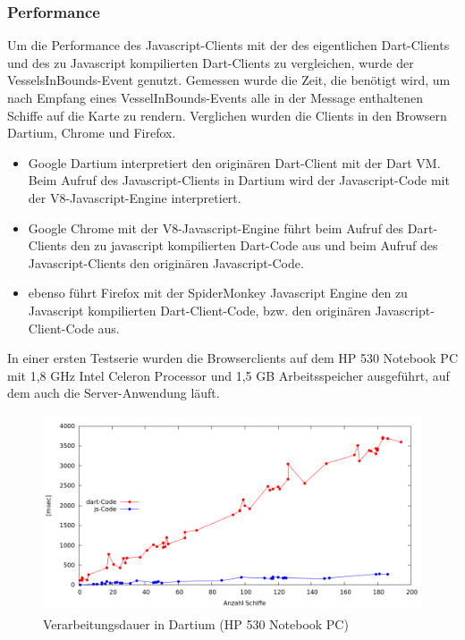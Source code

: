\subsubsection{Performance}
Um die Performance des Javascript-Clients mit der des eigentlichen Dart-Clients und des zu Javascript kompilierten Dart-Clients zu vergleichen, wurde der VesselsInBounds-Event genutzt. Gemessen wurde die Zeit, die benötigt wird, um nach Empfang eines VesselInBounds-Events alle in der Message enthaltenen Schiffe auf die Karte zu rendern. Verglichen wurden die Clients in den Browsern Dartium, Chrome und Firefox.
\begin{itemize}
\item Google Dartium interpretiert den originären Dart-Client mit der Dart VM. Beim Aufruf des Javascript-Clients in Dartium wird der Javascript-Code mit der V8-Javascript-Engine interpretiert.
\item Google Chrome  mit der V8-Javascript-Engine führt beim Aufruf des Dart-Clients den zu javascript kompilierten Dart-Code aus und beim Aufruf des Javascript-Clients den originären Javascript-Code.
\item ebenso führt Firefox mit der SpiderMonkey Javascript Engine den zu Javascript kompilierten Dart-Client-Code, bzw. den originären Javascript-Client-Code aus.
\end {itemize}
In einer ersten Testserie wurden die Browserclients auf dem HP 530 Notebook PC mit 1,8 GHz Intel Celeron Processor und 1,5 GB Arbeitsspeicher ausgeführt, auf dem auch die Server-Anwendung läuft.

\begin {figure}[H]
\begin{center}
  \includegraphics[height=2.3in]{images/Dartium.png}
\end{center}
 \caption{Verarbeitungsdauer in Dartium (HP 530 Notebook PC)}
\end {figure}


